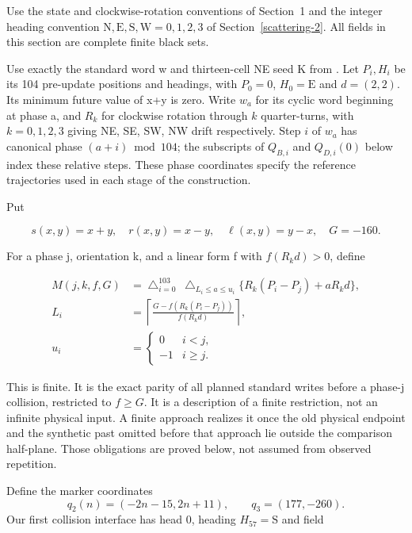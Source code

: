 Use the state and clockwise-rotation conventions of Section~1 and the integer
heading convention $\mathrm N,\mathrm E,\mathrm S,\mathrm W=0,1,2,3$ of
Section~\ref{scattering-2}. All
fields in this section are complete finite black sets.

Use exactly the standard word w and thirteen-cell NE seed K from
. Let
$P_i,H_i$ be its 104 pre-update positions and headings, with $P_0=0$,
$H_0=\mathrm E$ and $d=(2,2)$. Its minimum future value of x+y is zero. Write $w_a$
for its cyclic word beginning at phase a, and $R_k$ for clockwise
rotation through $k$ quarter-turns, with $k=0,1,2,3$ giving NE, SE, SW, NW
drift respectively. Step $i$ of $w_a$ has canonical phase $(a+i)\bmod104$;
the subscripts of $Q_{B,i}$ and $Q_{D,i}(0)$ below index these relative steps.
These phase coordinates specify the
reference trajectories used in each stage of the construction.

Put

\[
s(x,y)=x+y,\quad r(x,y)=x-y,\quad\ell(x,y)=y-x,\quad G=-160.
\]

For a phase j, orientation k, and a linear form f with $f(R_kd)>0$, define

\begin{equation}\label{eq:rt21}
\begin{aligned}M(j,k,f,G)&=\mathop{\triangle}_{i=0}^{103}\ \mathop{\triangle}_{L_i\le a\le u_i}\{R_k(P_i-P_j)+aR_kd\},\\L_i&=\left\lceil\frac{G-f(R_k(P_i-P_j))}{f(R_kd)}\right\rceil,\\u_i&=\begin{cases}0&i<j,\\-1&i\ge j.\end{cases}\end{aligned}
\end{equation}

This is finite. It is the exact parity of all planned standard writes
before a phase-j collision, restricted to $f\ge G$. It is a
description of a finite restriction, not an infinite physical input. A
finite approach realizes it once the old physical endpoint and the
synthetic past omitted before that approach lie outside the comparison
half-plane. Those obligations are proved below, not assumed from
observed repetition.

Define the marker coordinates
\[
q_2(n)=(-2n-15,2n+11),\qquad q_3=(177,-260).
\]
Our first collision interface has head 0, heading $H_{57}=\mathrm S$ and field

